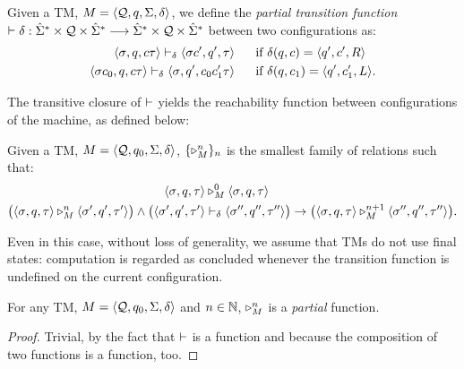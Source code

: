 \begin{defn}\label{df:TMTransition}
Given a TM, $M=\langle
\textcolor{black}{\mathcal{Q}}, \textcolor{black}{q}, \textcolor{black}{\Sigma}, \textcolor{black}{\delta}\rangle$,
we define the \emph{partial transition function}
$\vdash \delta: \hat{\Sigma}^* \times
\mathcal{Q} \times \hat{\Sigma}^* \longrightarrow
\hat{\Sigma}^* \times
\mathcal{Q} \times \hat{\Sigma}^*$
between two configurations as:
%
\begin{align*}
\langle \m{\sigma}, \m{q}, \m{c\tau}\rangle
%
\tmtrans_{\delta}
%
\langle \m{\sigma c'}, \m{q'}, \m{\tau}\rangle
%
\ \ \ \ \ &\text{if} \ \m{\delta}(\m{q},\m{c}) =
\langle \m{q'}, \m{c'}, \m{R}\rangle \\
%
%
%
\langle \m{\sigma c_0},
\m{q}, \m{c\tau}\rangle
\tmtrans_{\delta}
\langle \m{\sigma},
\m{q'}, \m{c_0c_1'\tau}\rangle
%
\ \ \ \ \ &\text{if} \ \m{\delta}(\m{q}, \m{c_1}) = \langle
\m{q'}, \m{c_1'}, \m{L}\rangle.
\end{align*}
%
\end{defn}
%
%
%
\noindent
The transitive closure of $\vdash$ yields the reachability
function between configurations of the machine, as defined below:


\begin{defn}\label{df:TMReachability}
Given a TM,
$M=\langle \textcolor{black}{\mathcal{Q}}, \textcolor{black}{q_0}, \textcolor{black}{\Sigma}, \textcolor{black}{\delta}\rangle$,
$\{\triangleright^n_M\}_n$ is the smallest
family of relations such that:
%
%
%
\begin{align*}
\langle \m{\sigma}, \m{q}, \m{\tau}\rangle
&\tmreach^0_M
\langle \m{\sigma}, \m{q}, \m{\tau}\rangle \\
%
%
\big(\langle \m{\sigma}, \m{q}, \m{\tau}\rangle
\tmreach^n_M
\langle \m{\sigma'}, \m{q'}, \m{\tau'}\rangle\big)
%
\wedge
%
\big(\langle \m{\sigma'}, \m{q'}, \m{\tau'}\rangle
%
&\tmtrans_\delta
%
\langle \m{\sigma''}, \m{q''}, \m{\tau''}\rangle\big)
\rightarrow
\big(\langle \m{\sigma}, \m{q}, \m{\tau}\rangle
\tmreach^{n+1}_M
\langle \m{\sigma''}, \m{q''}, \m{\tau''}\rangle\big).
\end{align*}
\end{defn}
%
%
%
%
\noindent
Even in this case, without loss of generality,
we assume that TMs do not use final states:
computation is regarded as concluded
whenever the transition function
is undefined on the current configuration.


\begin{prop}\label{proptm}
For any TM,
$M=\langle \textcolor{black}{\mathcal{Q}}, \textcolor{black}{q_0}, \textcolor{black}{\Sigma},\textcolor{black}{\delta}\rangle$
and $n\in \mathbb{N}$,
$\triangleright^n_M$ is a \emph{partial} function.
\end{prop}
\begin{proof}
  Trivial, by the fact that $\vdash$ is a function and because
  the composition of two functions is a function, too.
\end{proof}













